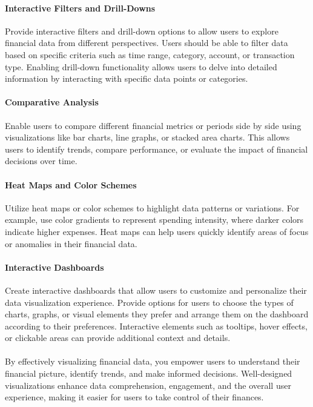 \paragraph{Interactive Filters and Drill-Downs}
Provide interactive filters and drill-down options to allow users to explore financial data from different 
perspectives. Users should be able to filter data based on specific criteria such as time range, category, 
account, or transaction type. Enabling drill-down functionality allows users to delve into detailed information 
by interacting with specific data points or categories.

\paragraph{Comparative Analysis}
Enable users to compare different financial metrics or periods side by side using visualizations like bar charts, 
line graphs, or stacked area charts. This allows users to identify trends, compare performance, or evaluate the 
impact of financial decisions over time.

\paragraph{Heat Maps and Color Schemes}
Utilize heat maps or color schemes to highlight data patterns or variations. For example, use color gradients to 
represent spending intensity, where darker colors indicate higher expenses. Heat maps can help users quickly identify 
areas of focus or anomalies in their financial data.

\paragraph{Interactive Dashboards}
Create interactive dashboards that allow users to customize and personalize their data visualization experience. 
Provide options for users to choose the types of charts, graphs, or visual elements they prefer and arrange them 
on the dashboard according to their preferences. Interactive elements such as tooltips, hover effects, or clickable 
areas can provide additional context and details.
\\
\\
By effectively visualizing financial data, you empower users to understand their financial picture, identify trends, 
and make informed decisions. Well-designed visualizations enhance data comprehension, engagement, and the overall 
user experience, making it easier for users to take control of their finances.


